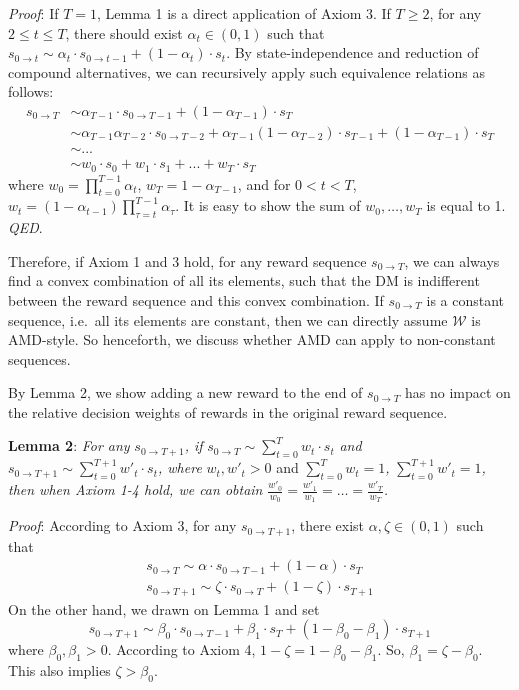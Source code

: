 \documentclass[
  12pt,
]{article}
\begin{document}
\noindent \emph{Proof}: If \(T=1\), Lemma 1 is a direct application of
Axiom 3. If \(T\geq 2\), for any \(2\leq t\leq T\), there should exist
\(\alpha_t\in(0,1)\) such that
\(s_{0\rightarrow t}\sim \alpha_t\cdot s_{0\rightarrow t-1}+(1-\alpha_t)\cdot s_{t}\).
By state-independence and reduction of compound alternatives, we can
recursively apply such equivalence relations as follows:\[
\begin{aligned}
s_{0\rightarrow T} &\sim \alpha_{T-1}\cdot s_{0\rightarrow T-1} + (1-\alpha_{T-1})\cdot s_T \\
&\sim  \alpha_{T-1}\alpha_{T-2}\cdot s_{0\rightarrow T-2} + \alpha_{T-1}(1-\alpha_{T-2})\cdot s_{T-1} + (1-\alpha_{T-1})\cdot s_T \\
& \sim ...\\
& \sim w_0 \cdot s_0 + w_1\cdot s_1 +... +w_T\cdot s_T
\end{aligned}
\]where \(w_0=\prod_{t=0}^{T-1}\alpha_t\), \(w_T = 1-\alpha_{T-1}\), and
for \(0<t<T\),
\(w_t=(1-\alpha_{t-1})\prod_{\tau=t}^{T-1}\alpha_{\tau}\). It is easy to
show the sum of \(w_0,…,w_T\) is equal to 1. \emph{QED}.

Therefore, if Axiom 1 and 3 hold, for any reward sequence
\(s_{0\rightarrow T}\), we can always find a convex combination of all
its elements, such that the DM is indifferent between the reward
sequence and this convex combination. If \(s_{0\rightarrow T}\) is a
constant sequence, i.e.~all its elements are constant, then we can
directly assume \(\mathcal{W}\) is AMD-style. So henceforth, we discuss
whether AMD can apply to non-constant sequences.

By Lemma 2, we show adding a new reward to the end of
\(s_{0\rightarrow T}\) has no impact on the relative decision weights of
rewards in the original reward sequence.

\noindent \textbf{Lemma 2}: \emph{For any}
\(s_{0\rightarrow T+1}\)\emph{, if}
\(s_{0\rightarrow T}\sim \sum_{t=0}^T w_t \cdot s_t\) \emph{and}
\(s_{0\rightarrow T+1} \sim \sum_{t=0}^{T+1} w'_t\cdot s_t\)\emph{,
where} \(w_t, w'_t>0\) and \(\sum_{t=0}^Tw_t=1\)\emph{,}
\(\sum_{t=0}^{T+1}w'_t=1\)\emph{, then when Axiom 1-4 hold, we can
obtain} \(\frac{w'_0}{w_0}=\frac{w'_1}{w_1}=…=\frac{w'_T}{w_T}\)\emph{.}

\noindent \emph{Proof}: According to Axiom 3, for any
\(s_{0\rightarrow T+1}\), there exist \(\alpha,\zeta \in (0,1)\) such
that\[\tag{A1}
\begin{aligned}
s_{0 \rightarrow T}\sim\alpha\cdot s_{0 \rightarrow T-1} + (1-\alpha)\cdot s_T \\
s_{0\rightarrow T+1} \sim \zeta\cdot s_{0\rightarrow T} + (1-\zeta)\cdot s_{T+1}
\end{aligned}
\]On the other hand, we drawn on Lemma 1 and set\[\tag{A2}
s_{0\rightarrow T+1} \sim \beta_0\cdot s_{0 \rightarrow T-1} + \beta_1\cdot s_T + (1-\beta_0-\beta_1)\cdot s_{T+1}
\]where \(\beta_0, \beta_1 > 0\). According to Axiom 4,
\(1-\zeta=1-\beta_0-\beta_1\). So, \(\beta_1=\zeta-\beta_0\). This also
implies \(\zeta > \beta_0\).
\end{document}
